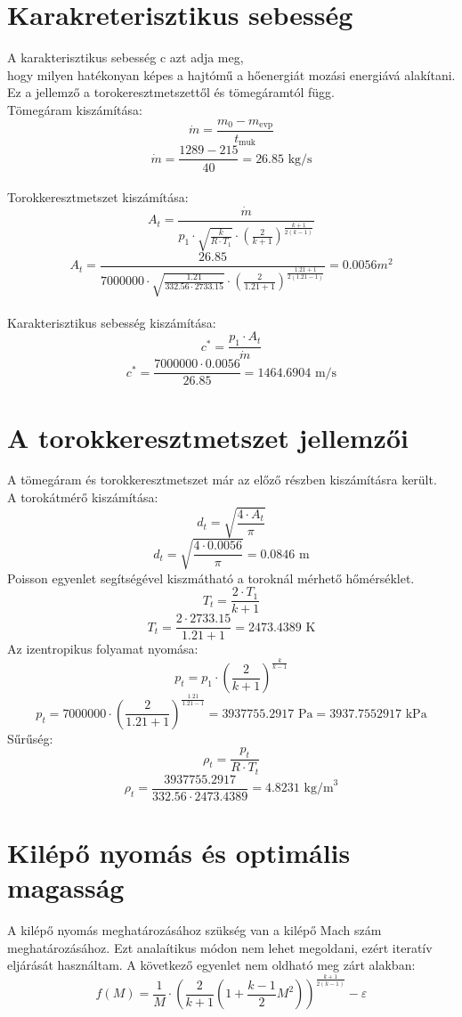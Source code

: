 \documentclass[a4paper,12pt]{article}
\begin{document}
\section{Karakreterisztikus sebesség}
A karakterisztikus sebesség c\* azt adja meg,\\ hogy milyen hatékonyan képes a hajtómű
a hőenergiát mozási energiává alakítani. Ez a jellemző a torokeresztmetszettől és tömegáramtól függ.
\\Tömegáram kiszámítása:
\[
\dot{m} = \frac{m_0 - m_{\text{evp}}}{t_{\text{muk}}}
\]
\[
\dot{m} = \frac{1289 - 215}{40} = 26.85 \text{ kg/s}
\]
\\Torokkeresztmetszet kiszámítása:
\[
A_t = \frac{\dot{m}}{p_1 \cdot \sqrt{\frac{k}{R \cdot T_1}} \cdot \left( \frac{2}{k+1} \right)^{\frac{k+1}{2(k-1)}}}
\]
\[
A_t = \frac{26.85}{7000000 \cdot \sqrt{\frac{1.21}{332.56 \cdot 2733.15}} \cdot \left( \frac{2}{1.21+1} \right)^{\frac{1.21+1}{2(1.21-1)}}} = 0.0056 m^2
\]
\\Karakterisztikus sebesség kiszámítása:
\[
c^* = \frac{p_1 \cdot A_t}{\dot{m}}
\]
\[
c^* = \frac{7000000 \cdot 0.0056}{26.85} = 1464.6904 \text{ m/s}
\]

\section{A torokkeresztmetszet jellemzői}
A tömegáram és torokkeresztmetszet már az előző részben kiszámításra került.\\
A torokátmérő kiszámítása:
\[
d_t = \sqrt{\frac{4 \cdot A_t}{\pi}}
\]
\[
d_t = \sqrt{\frac{4 \cdot 0.0056}{\pi}} = 0.0846 \text{ m}
\]
Poisson egyenlet segítségével kiszmátható a toroknál mérhető hőmérséklet.
\[
T_t = \frac{2 \cdot T_1}{k + 1}
\]
\[
T_t = \frac{2 \cdot 2733.15}{1.21 + 1} = 2473.4389 \text{ K}
\]
Az izentropikus folyamat nyomása:
\[
p_t = p_1 \cdot \left( \frac{2}{k + 1} \right)^{\frac{k}{k - 1}}
\]
\[
p_t = 7000000 \cdot \left( \frac{2}{1.21 + 1} \right)^{\frac{1.21}{1.21 - 1}} = 3937755.2917 \text{ Pa} = 3937.7552917 \text{ kPa}
\]
Sűrűség:
\[
\rho_t = \frac{p_t}{R \cdot T_t}
\]
\[
\rho_t = \frac{3937755.2917}{332.56 \cdot 2473.4389} = 4.8231 \text{ kg/m}^3
\]

\section{Kilépő nyomás és optimális magasság}
A kilépő nyomás meghatározásához szükség van a kilépő Mach szám meghatározásához. Ezt analaítikus módon nem lehet megoldani, ezért iteratív eljárását használtam. A következő egyenlet nem oldható meg zárt alakban:
\[
f(M) = \frac{1}{M} \cdot \left( \frac{2}{k+1} \left(1 + \frac{k-1}{2}M^2 \right) \right)^{\frac{k+1}{2(k-1)}} - \varepsilon
\]
\end{document}
